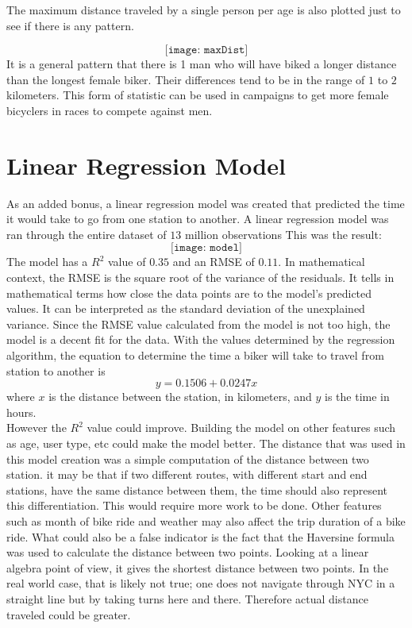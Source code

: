 \documentclass{article}
\begin{document}
The maximum distance traveled by a single person per age is also plotted just to see if there is any pattern. 

$$ \texttt{[image: maxDist]} $$ 
It is a general pattern that there is 1 man who will have biked a longer distance than the longest female biker. Their differences tend to be in the range of $1$ to $2$ kilometers. This form of statistic can be used in campaigns to get more female bicyclers in races to compete against men. 
\newpage
\section{Linear Regression Model} 
As an added bonus, a linear regression model was created that predicted the time it would take to go from one station to another. A linear regression model was ran through the entire dataset of $13$ million observations This was the result: 
$$ \texttt{[image: model]} $$ 
The model has a $R^2$ value of $0.35$ and an RMSE of $0.11$. In mathematical context, the RMSE is the square root of the variance of the residuals. It tells in mathematical terms how close the data points are to the model's predicted values. It can be interpreted as the standard deviation of the unexplained variance. Since the RMSE value calculated from the model is not too high, the model is a decent fit for the data. With the values determined by the regression algorithm, the equation to determine the time a biker will take to travel from station to another is
$$ y = 0.1506 + 0.0247x $$ where $x$ is the distance between the station, in kilometers, and $y$ is the time in hours. \\
However the $R^2$ value could improve. Building the model on other features such as age, user type, etc could make the model better. The distance that was used in this model creation was a simple computation of the distance between two station. it may be that if two different routes, with different start and end stations, have the same distance between them, the time should also represent this differentiation. This would require more work to be done. Other features such as month of bike ride and weather may also affect the trip duration of a bike ride. What could also be a false indicator is the fact that the Haversine formula was used to calculate the distance between two points. Looking at a linear algebra point of view, it gives the shortest distance between two points. In the real world case, that is likely not true; one does not navigate through NYC in a straight line but by taking turns here and there. Therefore actual distance traveled could be greater. 
\end{document}
